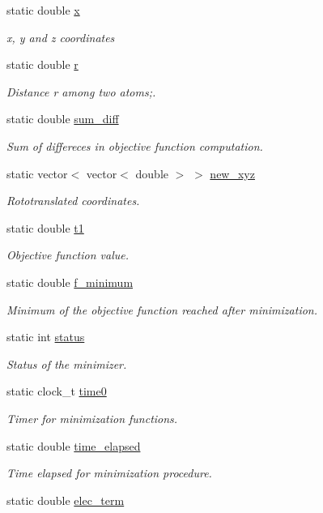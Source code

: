 \begin{DoxyCompactItemize}
static double \hyperlink{classMinimizer2_ad34cff3ae59c83548e2d5485e800897e}{x}
\begin{DoxyCompactList}\small\item\em x, y and z coordinates \end{DoxyCompactList}\item 
static double \hyperlink{classMinimizer2_a3f56599cc0464de622f4493ab209be67}{r}
\begin{DoxyCompactList}\small\item\em Distance r among two atoms;. \end{DoxyCompactList}\item 
static double \hyperlink{classMinimizer2_a2a073ef1806f84be7c4f4b8cf6f7f2a7}{sum\_\-diff}
\begin{DoxyCompactList}\small\item\em Sum of differeces in objective function computation. \end{DoxyCompactList}\item 
static vector$<$ vector$<$ double $>$ $>$ \hyperlink{classMinimizer2_a680a201172c6518d60325eaac358b371}{new\_\-xyz}
\begin{DoxyCompactList}\small\item\em Rototranslated coordinates. \end{DoxyCompactList}\item 
static double \hyperlink{classMinimizer2_afefc05f3f81b5f002041933d12352642}{t1}
\begin{DoxyCompactList}\small\item\em Objective function value. \end{DoxyCompactList}\item 
static double \hyperlink{classMinimizer2_a166a976d19a3c0c33222b3d000377586}{f\_\-minimum}
\begin{DoxyCompactList}\small\item\em Minimum of the objective function reached after minimization. \end{DoxyCompactList}\item 
static int \hyperlink{classMinimizer2_ab2fc020ca4f53c83045abb9533932e8f}{status}
\begin{DoxyCompactList}\small\item\em Status of the minimizer. \end{DoxyCompactList}\item 
static clock\_\-t \hyperlink{classMinimizer2_ac63693b02b0d74534c318db59499891b}{time0}
\begin{DoxyCompactList}\small\item\em Timer for minimization functions. \end{DoxyCompactList}\item 
static double \hyperlink{classMinimizer2_a2fefd1c40811da6a30fed3c273e624d7}{time\_\-elapsed}
\begin{DoxyCompactList}\small\item\em Time elapsed for minimization procedure. \end{DoxyCompactList}\item 
static double \hyperlink{classMinimizer2_adc7e28a36b3364eeeb2e176f101ec3eb}{elec\_\-term}
\end{DoxyCompactItemize}


